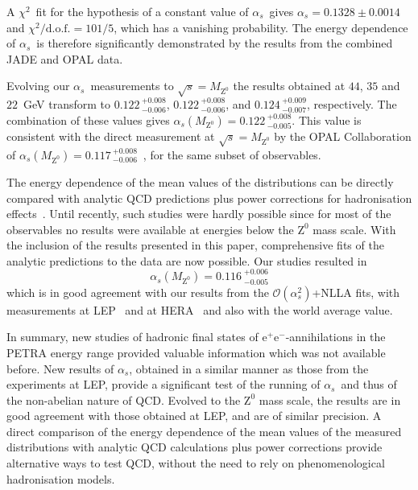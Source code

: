 \documentclass[12pt,a4paper,twoside]{article}
\newcommand{\epem}   {\ensuremath{\mathrm{e^+e^-}}}
\newcommand{\as}     {\ensuremath{\alpha_s}}
\newcommand{\asmz}   {\ensuremath{\alpha_s(M_{\mathrm{Z^0}})}}
\newcommand{\oaa}    {\ensuremath{\mathcal{O}(\alpha_s^2)}}
\newcommand{\znull}  {\ensuremath{\mathrm{Z^0}}}
\newcommand{\mz}     {\ensuremath{M_{\mathrm{Z^0}}}}
\newcommand{\chisq}  {\ensuremath{\chi^2}}
\newcommand{\chisqd} {\ensuremath{\chi^2/\mathrm{d.o.f.}}}
\begin{document}
A \chisq\ fit for the hypothesis of a constant value of \as\ gives 
$\as=0.1328 \pm 0.0014$ and $\chisqd = 101/5$,
which has a vanishing probability.
The energy dependence of \as\ is therefore significantly demonstrated by 
the
results from the combined JADE and OPAL data.

Evolving our \as\ measurements to $\sqrt{s} = \mz$ the results obtained at
$44$, $35$ and $22$~GeV transform to $0.122\,^{+0.008}_{-0.006}$, 
$0.122\,^{+0.008}_{-0.006}$, and $0.124\,^{+0.009}_{-0.007}$, respectively. 
The combination of these values gives $\asmz = 0.122\,^{+0.008}_{-0.005}$. 
This value is consistent with the direct measurement at $\sqrt{s} = \mz$ 
by the OPAL Collaboration of 
$\as ( \mz ) = 0.117\,^{+0.008}_{-0.006}$~\cite{bib-OPALresummed}, for 
the same subset of observables.

The energy dependence of the mean values of the distributions can be
directly compared with analytic QCD predictions plus power corrections
for hadronisation effects~\cite{bib-webber}.
Until recently, such studies were hardly possible since for most of the
observables no results were available at energies below the
$\znull$ mass scale. With the inclusion of the results presented in this
paper,  comprehensive fits of the analytic predictions to the data are now
possible. Our studies resulted in 
\begin{displaymath}
   \as(\mz) = 0.116\ ^{+0.006}
                     _{-0.005}
\end{displaymath}
which is
in good agreement with our results from the \oaa+NLLA fits, with measurements
at LEP~\cite{bib-DELPHI-powcor} and at HERA~\cite{bib-H1-powcor} and also
with the world average value. 

\par \par
In summary, new studies of hadronic final states of
$\epem$-annihilations in the PETRA energy range provided valuable 
information which was not available before. 
New results of \as, obtained in a similar manner as those from the
experiments at LEP, provide a significant test of the running of \as\
and thus of the non-abelian nature of QCD. 
Evolved to the $\znull$ mass scale, the results are in good agreement
with those obtained at LEP, and are of similar precision.
A direct comparison of the energy dependence of the mean values of the
measured distributions with analytic QCD calculations plus power
corrections provide alternative ways to test QCD, without
the need to rely on phenomenological hadronisation models.
\end{document}
